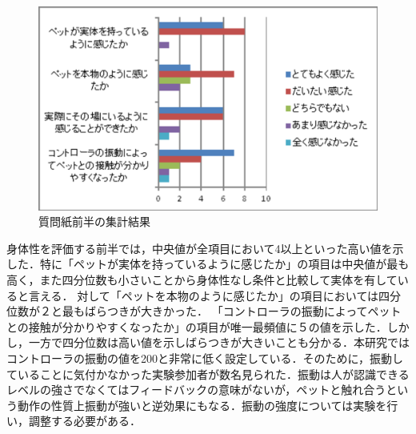 \begin{figure}[H]
\centering
\includegraphics*[width=12cm,clip]{images/graphic1.eps}
\caption{質問紙前半の集計結果}
\label{fig:chart1}
\end{figure} 

\begin{table}[H]
\centering
\caption{質問紙前半の分析結果}
\label{table:analysis1}
\end{table}

身体性を評価する前半では，中央値が全項目において4以上といった高い値を示した．特に「ペットが実体を持っているように感じたか」の項目は中央値が最も高く，また四分位数も小さいことから身体性なし条件と比較して実体を有していると言える．
対して「ペットを本物のように感じたか」の項目においては四分位数が２と最もばらつきが大きかった．
「コントローラの振動によってペットとの接触が分かりやすくなったか」の項目が唯一最頻値に５の値を示した．しかし，一方で四分位数は高い値を示しばらつきが大きいことも分かる．本研究ではコントローラの振動の値を200と非常に低く設定している．そのために，振動していることに気付かなかった実験参加者が数名見られた．振動は人が認識できるレベルの強さでなくてはフィードバックの意味がないが，ペットと触れ合うという動作の性質上振動が強いと逆効果にもなる．振動の強度については実験を行い，調整する必要がある．

